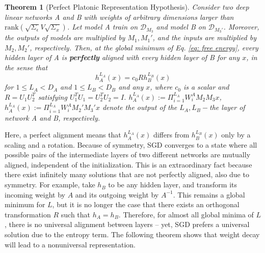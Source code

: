 \documentclass{article}
\theoremstyle{plain}
\newtheorem{theorem}{Theorem}
\newcommand{\E}{\mathbb{E}}
\newcommand{\Tr}{{\rm Tr}}
\begin{document}

\begin{theorem}[Perfect Platonic Representation Hypothesis]\label{theo: universal representation}
Consider two deep linear networks A and B with weights of arbitrary dimensions larger than $\text{rank}(\sqrt{\Sigma_\epsilon}V\sqrt{\Sigma_x})$. Let model A train on $\mathcal{D}_{M_3}$ and model B on $\mathcal{D}_{M_3'}$. Moreover, the outputs of models are multiplied by $M_1,M_1'$, and the inputs are multiplied by $M_2,M_2'$, respectively. Then, at the global minimum of Eq. \eqref{eq: free energy}, every hidden layer of A is \textbf{perfectly} aligned with every hidden layer of B for any $x$, in the sense that
\begin{equation}
h_A^{L_A}(x)=c_0Rh_B^{L_B}(x)
\end{equation}
for $1\leq L_A<D_A$ and $1\leq L_B<D_B$ and any $x$, where
$c_0$ is a scalar and $R=U_1U_2^T$ satisfying $U_1^TU_1=U_2^TU_2=I$. $h_A^{L_A}(x):=\Pi_{i=1}^{L_A}W_i^AM_2M_3x$, $h_A^{L_A}(x):=\Pi_{i=1}^{L_A}W_i^AM_2'M_3'x$ denote the output of the $L_A,L_B-$the layer of network A and B, respectively.

\end{theorem}
Here, a perfect alignment means that $h_A^{L_A}(x)$ differs from $h_B^{L_B}(x)$ only by a scaling and a rotation. Because of symmetry, SGD converges to a state where all possible pairs of the intermediate layers of two different networks are mutually aligned, independent of the initialization. This is an extraordinary fact because there exist infinitely many solutions that are not perfectly aligned, also due to symmetry. For example, take $h_B$ to be any hidden layer, and transform its incoming weight by $A$ and its outgoing weight by $A^{-1}$. This remains a global minimum for $L$, but it is no longer the case that there exists an orthogonal transformation $R$ such that $h_A = h_B$. Therefore, for almost all global minima of $L$, there is no universal alignment between layers -- yet, SGD prefers a universal solution due to the entropy term. The following theorem shows that weight decay will lead to a nonuniversal representation.
\end{document}
